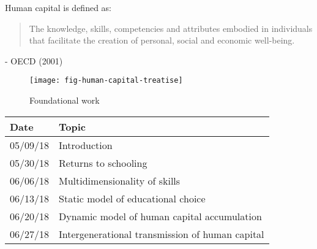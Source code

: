 \begin{frame}
Human capital is defined as:
\vspace{\baselineskip}

\begin{quote}
The knowledge, skills, competencies and attributes embodied in individuals that facilitate
the creation of personal, social and economic well-being.
\end{quote}\vspace{-0.5pt} \hspace{6cm} - OECD (2001)
\end{frame}

\begin{frame}
	\begin{figure}
		\caption{Foundational work}
		\centering\texttt{[image: fig-human-capital-treatise]}
	\end{figure}
\end{frame}
\begin{frame}
\centering
\begin{threeparttable}\footnotesize
  \caption{Lecture plan}
  \begin{tabular}{ll}\toprule
  Date & Topic \\\midrule
05/09/18 & Introduction\\
05/30/18 & Returns to schooling \\
06/06/18 & Multidimensionality of skills \\
06/13/18 & Static model of educational choice \\
06/20/18 & Dynamic model of human capital accumulation \\
06/27/18 & Intergenerational transmission of human capital\\
\bottomrule
\end{tabular}
\end{threeparttable}
\end{frame}

